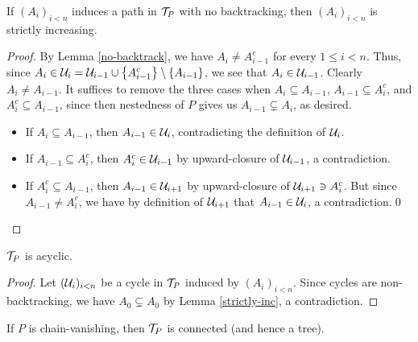 \documentclass{amsart}
\begin{document}
    \begin{lemma}\label{strictly-inc}
        If $(A_i)_{i<n}$ induces a path in $\mathcal{T}_P$ with no backtracking, then $(A_i)_{i<n}$ is strictly increasing.
    \end{lemma}
    \begin{proof}
        By Lemma \ref{no-backtrack}, we have $A_i\neq A_{i-1}^c$ for every $1\leq i<n$. Thus, since $A_i\in\mathcal{U}_i=\mathcal{U}_{i-1}\cup\left\{A_{i-1}^c\right\}\setminus\left\{A_{i-1}\right\}$, we see that $A_i\in\mathcal{U}_{i-1}$. Clearly $A_i\neq A_{i-1}$. It suffices to remove the three cases when $A_i\subseteq A_{i-1}$, $A_{i-1}\subseteq A_i^c$, and $A_i^c\subseteq A_{i-1}$, since then nestedness of $P$ gives us $A_{i-1}\subsetneq A_i$, as desired.
        \begin{itemize}
            \item If $A_i\subseteq A_{i-1}$, then $A_{i-1}\in\mathcal{U}_i$, contradicting the definition of $\mathcal{U}_i$.
            \item If $A_{i-1}\subseteq A_i^c$, then $A_i^c\in\mathcal{U}_{i-1}$ by upward-closure of $\mathcal{U}_{i-1}$, a contradiction.
            \item If $A_i^c\subseteq A_{i-1}$, then $A_{i-1}\in\mathcal{U}_{i+1}$ by upward-closure of $\mathcal{U}_{i+1}\ni A_i^c$. But since $A_{i-1}\neq A_i^c$, we have by definition of $\mathcal{U}_{i+1}$ that $A_{i-1}\in\mathcal{U}_i$, a contradiction.\qed
        \end{itemize}
    \end{proof}

    \begin{proposition}\label{acyclic}
        $\mathcal{T}_P$ is acyclic.
    \end{proposition}
    \begin{proof}
        Let $(\mathcal{U}_i)_{i<n}$ be a cycle in $\mathcal{T}_P$ induced by $(A_i)_{i<n}$. Since cycles are non-backtracking, we have $A_0\subsetneq A_0$ by Lemma \ref{strictly-inc}, a contradiction.
    \end{proof}

    \begin{proposition}\label{tree}
        If $P$ is chain-vanishing, then $\mathcal{T}_P$ is connected (and hence a tree).
    \end{proposition}

    {}
\end{document}
